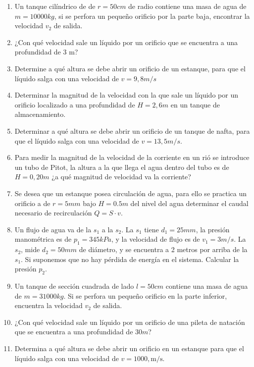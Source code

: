 \documentclass[../main]{subfiles}
\begin{document}
\begin{enumerate}
  \item Un tanque cilíndrico de de $r=50cm$ de radio contiene una
    masa de agua de $m=10000kg$, si se perfora un pequeño orificio
    por la parte baja, encontrar la velocidad $v_2$ de salida.
  \item ¿Con qué velocidad sale un líquido por un orificio que se
    encuentra a una profundidad de 3 m?
  \item  Determine a qué altura se debe abrir un orificio de un
    estanque, para que el líquido salga con una velocidad de $v=9,8 m/s$
  \item Determinar la magnitud de la velocidad con la que sale un
    líquido por un orificio localizado a una profundidad de $H=2,6m$
    en un tanque de almacenamiento.
  \item  Determinar a qué altura se debe abrir un orificio de un
    tanque de nafta, para que el líquido salga con una velocidad de
    $v=13,5 m/s$.
  \item Para medir la magnitud de la velocidad de la corriente en un
    rió se introduce un tubo de Pitot, la altura a la que llega el
    agua dentro del tubo es de $H=0,20m$ ¿a qué magnitud de velocidad
    va la corriente?
  \item Se desea que un estanque posea circulación de agua, para ello
    se practica un orificio a de $r=5mm$ bajo $H=0.5m$ del nivel del
    agua determinar el caudal necesario de recirculación $Q=S \cdot v$.
  \item  Un flujo de agua va de la $s_1$ a la $s_2$. La $s_1$ tiene
    $d_1=25mm$, la presión manométrica es de $p_1=345kPa$, y la
    velocidad de flujo es de $v_1=3 m/s$. La $s_2$, mide $d_2=50mm$
    de diámetro, y se encuentra a 2 metros por arriba de la $s_1$. Si
    suponemos que no hay pérdida de energía en el sistema. Calcular
    la presión $p_2$.
  \item Un tanque de sección cuadrada de lado $l = 50 cm$ contiene
    una masa de agua de $m = 31000kg$. Si se perfora un pequeño
    orificio en la parte inferior, encuentra la velocidad $v_2$ de salida.

  \item ¿Con qué velocidad sale un líquido por un orificio de una
    pileta de natación que se encuentra a una profundidad de $30m$?


  \item Determina a qué altura se debe abrir un orificio en un
    estanque para que el líquido salga con una velocidad de $v = 1000
    , \text{m/s}$.


\end{enumerate}
\end{document}
